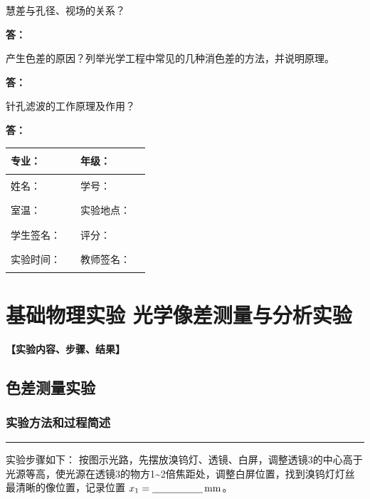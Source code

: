 \documentclass[dvipsnames, svgnames,a4paper,11pt]{article}
\newcommand{\answerblank}[1][3.8cm]{%
  \par\nopagebreak[4]\noindent\textbf{答：}\par\nopagebreak[4]\vspace*{#1}}
\newcommand{\recordblank}[1]{%
  \par\noindent\rule{0.95\linewidth}{0pt}\rule{0pt}{#1}\par}
\begin{document}
\begin{question}
	慧差与孔径、视场的关系？
\end{question}
\answerblank[3.8cm]
\begin{question}
	产生色差的原因？列举光学工程中常见的几种消色差的方法，并说明原理。
\end{question}
\answerblank[3.8cm]
\begin{question}
	针孔滤波的工作原理及作用？
\end{question}
\answerblank[3.8cm]
\clearpage
\begin{table}
	\renewcommand\arraystretch{1.7}
	\centering
	\begin{tabularx}{\textwidth}{|X|X|X|X|}
	\hline
	专业：& \rule{2.5cm}{0.4pt} &年级：& \rule{2.5cm}{0.4pt} \\
	\hline
	姓名： &\rule{2.5cm}{0.4pt}  & 学号：&\rule{3cm}{0.4pt}  \\
	\hline
	室温：& \rule{2.5cm}{0.4pt} & 实验地点： & \rule{2.5cm}{0.4pt} \\
	\hline
	学生签名：&\rule{2.5cm}{0.4pt} & 评分： &\\
	\hline
	实验时间：& \rule{3cm}{0.4pt} & 教师签名：& \rule{3cm}{0.4pt} \\
	\hline
	\end{tabularx}
\end{table}

\section{基础物理实验 \quad 光学像差测量与分析实验 }

\textbf{【实验内容、步骤、结果】}

\subsection{色差测量实验}

\subsubsection{实验方法和过程简述}

\recordblank{5cm}

实验步骤如下：
按图示光路，先摆放溴钨灯、透镜、白屏，调整透镜3的中心高于光源等高，使光源在透镜3的物方1\textasciitilde2倍焦距处，调整白屏位置，找到溴钨灯灯丝最清晰的像位置，记录位置 $x_1=\underline{\hspace{1.8cm}}\,\mathrm{mm}$。
\end{document}
